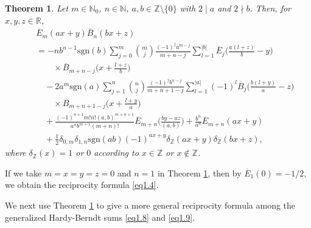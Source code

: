 \documentclass[reqno]{amsart}
\numberwithin{equation}{section}
\newtheorem{theorem}[thm]{Theorem}
\begin{document}
\begin{theorem}\label{thm2.1} Let $m\in\mathbb{N}_{0}$, $n\in\mathbb{N}$, $a,b\in\mathbb{Z}\setminus\{0\}$ with $2\mid a$ and $2\nmid b$. Then, for $x,y,z\in\mathbb{R}$,
\begin{eqnarray}\label{eq2.3}
&&\overline{E}_{m}(ax+y)\overline{B}_{n}(bx+z)\nonumber\\
&&=-nb^{n-1}\mathrm{sgn}(b)
\sum_{j=0}^{m}\binom{m}{j}\frac{(-1)^{j}a^{m-j}}{m+n-j}\sum_{l=1}^{|b|}\overline{E}_{j}\biggl(\frac{a(l+z)}{b}-y\biggl)\nonumber\\
&&\qquad\times\overline{B}_{m+n-j}\biggl(x+\frac{l+z}{b}\biggl)\nonumber\\
&&\quad-2a^{m}\mathrm{sgn}(a)\sum_{j=1}^{n}\binom{n}{j}\frac{(-1)^{j}b^{n-j}}{m+n+1-j}\sum_{l=1}^{|a|}(-1)^{l}\overline{B}_{j}\biggl(\frac{b(l+y)}{a}-z\biggl)\nonumber\\
&&\qquad\times\overline{B}_{m+n+1-j}\biggl(x+\frac{l+y}{a}\biggl)\nonumber\\
&&\quad+\frac{(-1)^{n+1}m!n!(a,b)^{m+n+1}}{a^{n}b^{m+1}(m+n)!}\overline{E}_{m+n}\biggl(\frac{by-az}{(a,b)}\biggl)+\frac{b^{n}}{a^{n}}\overline{E}_{m+n}(ax+y)\nonumber\\
&&\quad+\frac{1}{2}\delta_{0,m}\delta_{1,n}\mathrm{sgn}(ab)(-1)^{ax+y}\delta_{\mathbb{Z}}(ax+y)\delta_{\mathbb{Z}}(bx+z),
\end{eqnarray}
where $\delta_{\mathbb{Z}}(x)=1$ or $0$ according to $x\in\mathbb{Z}$ or $x\not\in\mathbb{Z}$.
\end{theorem}

If we take $m=x=y=z=0$ and $n=1$ in Theorem \ref{thm2.1}, then by $\overline{E}_{1}(0)=-1/2$, we obtain the reciprocity formula \eqref{eq1.4}.

We next use Theorem \ref{thm2.1} to give a more general reciprocity formula among the generalized Hardy-Berndt sums \eqref{eq1.8} and \eqref{eq1.9}.
\end{document}
